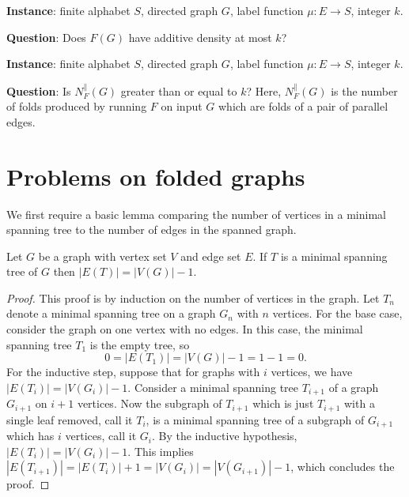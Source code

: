 \documentclass{article}
\newcommand{\FD}{\textsc{Folded Density}}
\newcommand{\PFolds}{\textsc{Parallel Folds}}
\newcommand{\Instance}{\textbf{Instance}: }
\newcommand{\Question}{\textbf{Question}: }
\begin{document}
\begin{definition}[\FD]
  \setlength{\parindent}{0pt}
  \mbox{}

  \Instance finite alphabet $S$, directed graph $G$, label function $\mu \colon E \to S$, integer $k$.

  \Question Does $F(G)$ have additive density at most $k$?
\end{definition}

\begin{definition}[\PFolds]
  \setlength{\parindent}{0pt}
  \mbox{}

  \Instance finite alphabet $S$, directed graph $G$, label function $\mu \colon E \to S$, integer $k$.

  \Question Is $N^\|_F(G)$ greater than or equal to $k$? Here, $N^\|_F(G)$ is the number of folds produced by running $F$ on input $G$ which are folds of a pair of parallel edges.
\end{definition}

\section{Problems on folded graphs}

We first require a basic lemma comparing the number of vertices in a minimal spanning tree to the number of edges in the spanned graph.

\begin{lemma}\label{lem:tree}
  Let $G$ be a graph with vertex set $V$ and edge set $E$.
  If $T$ is a minimal spanning tree of $G$ then $|E(T)| = |V(G)| - 1$.
\end{lemma}
\begin{proof}
  This proof is by induction on the number of vertices in the graph.
  Let $T_n$ denote a minimal spanning tree on a graph $G_n$ with $n$ vertices.
  For the base case, consider the graph on one vertex with no edges.
  In this case, the minimal spanning tree $T_1$ is the empty tree, so
  \begin{equation*}
    0 = |E(T_1)| = |V(G)| - 1 = 1 - 1 = 0.
  \end{equation*}
  For the inductive step, suppose that for graphs with $i$ vertices, we have $|E(T_i)| = |V(G_i)| - 1$.
  Consider a minimal spanning tree $T_{i + 1}$ of a graph $G_{i + 1}$ on $i + 1$ vertices.
  Now the subgraph of $T_{i + 1}$ which is just $T_{i + 1}$ with a single leaf removed, call it $T_i$, is a minimal spanning tree of a subgraph of $G_{i + 1}$ which has $i$ vertices, call it $G_i$.
  By the inductive hypothesis, $|E(T_i)| = |V(G_i)| - 1$.
  This implies $|E(T_{i + 1})| = |E(T_i)| + 1 = |V(G_i)| = |V(G_{i + 1})| - 1$, which concludes the proof.
\end{proof}
\end{document}
